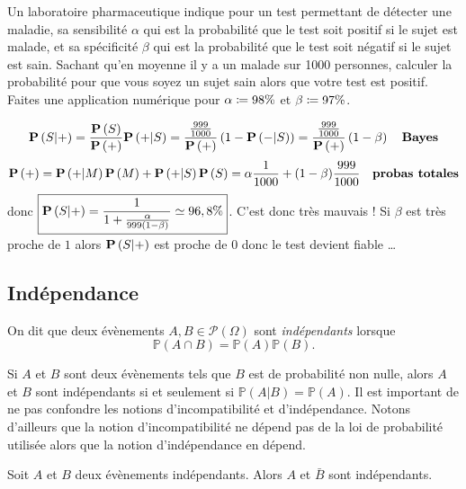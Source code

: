 \documentclass{magnolia}
\begin{document}
\begin{exoUnique}
\exo Un laboratoire pharmaceutique indique pour un test permettant de détecter une maladie,
  sa sensibilité $\alpha$ qui est la probabilité que le test soit positif si le sujet est
  malade, et sa spécificité $\beta$ qui est la probabilité que le test soit négatif si le
  sujet est sain. Sachant qu'en moyenne il y a un malade sur 1000 personnes,
  calculer la probabilité pour que vous soyez un sujet sain alors que votre test est positif.
  Faites une application numérique pour $\alpha\coloneqq 98\%$ et $\beta\coloneqq 97\%$. 
   \begin{sol}
   $$\pr{S | +} = \frac{\pr{S}}{\pr{+}} \pr{+ |S}= \frac{ \frac{999}{1000}}{\pr{+}} \left( 1 - \pr{- |S} \right)= \frac{ \frac{999}{1000}}{\pr{+}} \left( 1 - \beta \right) \quad \textbf{Bayes}$$
   $$\pr{+}=\pr{+ | M} \pr{M} + \pr{+ | S} \pr{S} = \alpha \frac 1{1000} + (1-
   \beta) \frac{999}{1000} \quad \textbf{probas totales}$$
   donc $\boxed{\pr{S | +} = \frac 1{1+ \frac{\alpha}{999(1-\beta)}} \simeq
   96,8 \%}$. C'est donc très mauvais ! Si $\beta$ est très proche de $1$ alors
   $\pr{S | +}$ est proche de $0$ donc le test devient fiable \dots
   \end{sol}
\end{exoUnique}

\subsection{Indépendance}

\begin{definition}
On dit que deux évènements
$A,B\in\mathcal{P}(\Omega)$ sont \emph{indépendants} lorsque
\[\mathbb{P}(A\cap B)=\mathbb{P}(A)\mathbb{P}(B).\]
\end{definition}

\begin{remarques}
\remarque Si $A$ et $B$ sont deux évènements tels que $B$ est de probabilité non nulle,
  alors $A$ et $B$ sont indépendants si et seulement si $\mathbb{P}(A|B)=\mathbb{P}(A)$.
\remarque Il est important de ne pas confondre les notions d'incompatibilité et d'indépendance.
  Notons d'ailleurs que la notion d'incompatibilité ne dépend pas de la loi de probabilité
  utilisée alors que la notion d'indépendance en dépend.
\end{remarques}

\begin{proposition}
Soit $A$ et $B$ deux évènements indépendants. Alors $A$ et $\bar{B}$ sont indépendants.
\end{proposition}
\end{document}
